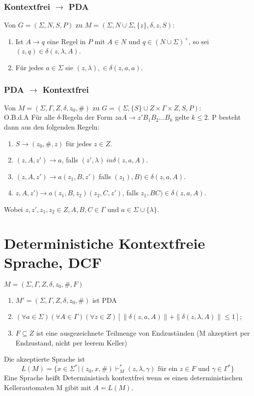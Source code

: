 \documentclass[9pt]{article}
\begin{document}
 \subsubsection{Kontextfrei $\to$ PDA}
 Von $G = (\Sigma, N, S, P)$ zu $M = (\Sigma, N\cup\Sigma, \{z\}, \delta, z, S)$:
 \begin{enumerate}
 	\item Ist $A \to q$ eine Regel in $P$ mit $A \in N$ und $q \in (N \cup \Sigma)^+$, so sei $(z, q) \in \delta(z, \lambda, A)$.
 	\item Für jedes $a \in \Sigma$ sie $(z, \lambda), \in \delta(z, a, a)$.
 \end{enumerate}
\subsubsection{PDA $\to$ Kontextfrei}
 Von $M = (\Sigma, \Gamma, Z, \delta, z_0, \#)$ zu $G = (\Sigma, \{S\} \cup Z \times \Gamma \times Z, S, P)$:\\
 O.B.d.A Für alle $\delta$-Regeln der Form $zaA \to z'B_1B_2\dots B_k$ gelte $k \le 2$.
 P besteht dann aus den folgenden Regeln:
 \begin{enumerate}
 	\item $S \to (z_0, \#, z)$ für jedes $z \in Z$.
 	\item $(z, A, z') \to a$, falls $(z', \lambda) \ in \delta(z, a, A)$.
 	\item $(z, A, z') \to a(z_1, B, z')$ falls $(z_1), B) \in \delta(z, a, A)$.
 	\item $z, A, z') \to a(z_1, B, z_2)(z_2, C, z')$, falls $z_1, BC) \in \delta(z, a, A)$.
 \end{enumerate}
 Wobei $z, z', z_1, z_2 \in Z, A, B, C \in \Gamma$ und $a \in \Sigma \cup \{\lambda\}$.
\section{Deterministiche Kontextfreie Sprache, DCF}
$M = (\Sigma, \Gamma, Z, \delta, z_0, \#, F)$
\begin{enumerate}
	\item $M' = (\Sigma, \Gamma, Z, \delta, z_0, \#)$ ist PDA
	\item $(\forall a \in \Sigma)(\forall A \in \Gamma)(\forall z \in Z)[\|\delta(z, a, A)\| + \|\delta(z, \lambda, A)\| \le 1]$;
	\item $F \subseteq Z$ ist eine ausgezeichnete Teilmenge von Endzuständen (M akzeptiert per Endzustand, nicht per leerem Keller)
\end{enumerate}
Die akzeptierte Sprache ist
$$L(M) = \{x \in \Sigma^*|(z_0, x, \#)\vdash^*_M (z, \lambda, \gamma) \text{ für ein } z \in F \text{ und } \gamma \in \Gamma^*\}$$
Eine Sprache heißt Deterministisch kontextfrei wenn es einen deterministischen Kellerautomaten M gibit mit $A = L(M)$.
\end{document}
